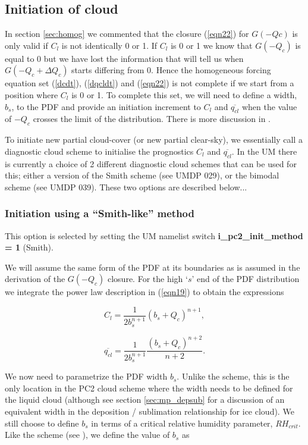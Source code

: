 \documentclass{UMDP_article}
\begin{document}
\subsection{Initiation of cloud}
\label{sec:init}
In section \ref{sec:homog} we commented that the closure (\ref{eqn22}) for $G(-Qc)$
is only valid if $C_l$ is not identically 0 or 1. If $C_l$
is 0 or 1 we know that $G(-Q_c)$ is equal to 0 but we have lost the
information that will tell us when $G(-Q_c + \Delta Q_c)$ starts
differing from 0. Hence the homogeneous forcing equation set
(\ref{dcdt}), (\ref{dqcldt}) and (\ref{eqn22}) is not complete if
we start from a position where $C_l$ is 0 or 1. To complete this set,
we will need to define a width, $b_s$, to the PDF and provide an initiation
increment to $C_l$ and $\overline{q_{cl}}$ when the value of $-Q_c$ crosses
the limit of the distribution. There is more discussion in
\cite{wg03}.

To initiate new partial cloud-cover (or new partial clear-sky), we essentially
call a diagnostic cloud scheme to initialise the prognostics
$C_l$ and $\overline{q_{cl}}$.
In the UM there is currently a choice of 2 different diagnostic cloud
schemes that can be used for this; either a version of the Smith scheme
(see UMDP 029), or the bimodal scheme (see UMDP 039).
These two options are described below...

\subsubsection{Initiation using a ``Smith-like'' method}

This option is selected by setting the UM namelist switch
{\bf i\_pc2\_init\_method = 1} (Smith).

We will assume the same form of the PDF at its boundaries as is
assumed in the derivation of the $G(-Q_c)$ closure. For the high `$s$' end
of the PDF distribution we integrate the power law description in
(\ref{eqn19}) to obtain the expressions

\begin{equation}
C_l = \frac{1}{2 b_s^{n+1}} (b_s + Q_c)^{n+1} ,
\label{eq:initc}
\end{equation}

\begin{equation}
\overline{q_{cl}} = \frac{1}{2 b_s^{n+1}} \frac{(b_s + Q_c)^{n+2}}{n+2} .
\label{eq:initqcl}
\end{equation}

We now need to parametrize the PDF width $b_s$. Unlike the \cite{smith90} 
scheme, this is the only
location in the PC2 cloud scheme where the width needs to be defined
for the liquid cloud (although see section \ref{sec:mp_depsub} for
a discussion of an equivalent width in the deposition / sublimation
relationship for ice cloud). We still choose to define $b_s$ in
terms of a critical relative humidity parameter, $RH_{crit}$. Like
the \cite{smith90} scheme (see ),
we define the value of $b_s$ as
\end{document}
